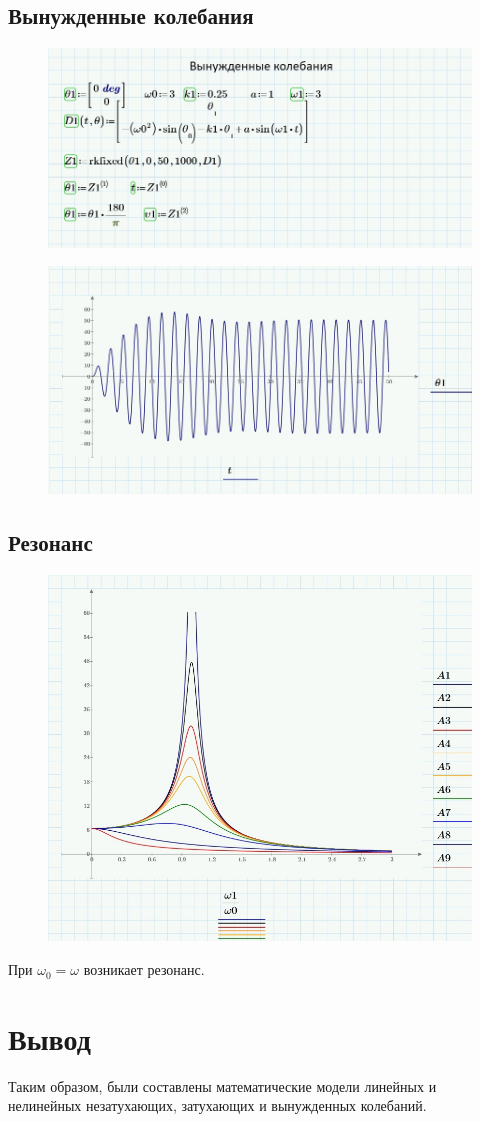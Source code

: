 \documentclass[a4paper, 14pt]{extarticle}
\begin{document}
	\subsection{Вынужденные колебания}
		\begin{figure}[H]
			\centering
			\includegraphics[width = \linewidth]{16.jpg}
		\end{figure}
		\begin{figure}[H]
			\centering
			\includegraphics[width = \linewidth]{17.jpg}
		\end{figure}
		\subsection{Резонанс}
		\begin{figure}[H]
			\centering
			\includegraphics[width = \linewidth]{18.jpg}
		\end{figure}
		При $\omega_0 = \omega$ возникает резонанс.
		
	\section{Вывод}
		Таким образом, были составлены математические модели линейных и нелинейных незатухающих, затухающих и вынужденных колебаний. 
		
\end{document}
